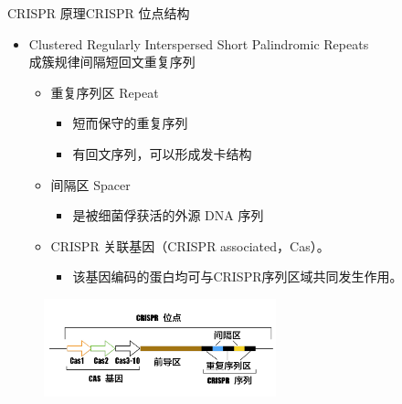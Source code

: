 \documentclass{beamer}
\begin{document}

\begin{frame}{CRISPR 原理}{CRISPR 位点结构}
		
	\begin{itemize}
		\item Clustered Regularly Interspersed Short Palindromic Repeats\\成簇规律间隔短回文重复序列
		\begin{itemize}
			\item 重复序列区 Repeat
			\begin{itemize}
				\item 短而保守的重复序列
				\item 有回文序列，可以形成发卡结构 
			\end{itemize}
			\item 间隔区 Spacer
			\begin{itemize}
				\item 是被细菌俘获活的外源 DNA 序列 
			\end{itemize}
			\item CRISPR 关联基因（CRISPR associated，Cas）。
			\begin{itemize}
				\item 该基因编码的蛋白均可与CRISPR序列区域共同发生作用。
			\end{itemize}
		\end{itemize}
	\end{itemize}


	\begin{figure}
		\centering
		\includegraphics[width=0.6\textwidth]{img/CRISPR_struc.jpeg}
	\end{figure}

\end{frame}

\end{document}
